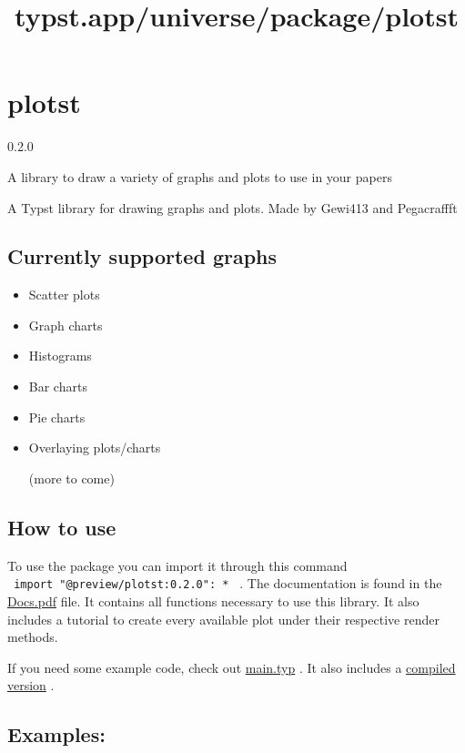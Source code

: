 \title{typst.app/universe/package/plotst}

\label{banner}
\section{plotst}\label{plotst}

{ 0.2.0 }

A library to draw a variety of graphs and plots to use in your papers

\label{readme}
A Typst library for drawing graphs and plots. Made by Gewi413 and
Pegacraffft

\subsection{Currently supported
graphs}\label{currently-supported-graphs}

\begin{itemize}
\item
  Scatter plots
\item
  Graph charts
\item
  Histograms
\item
  Bar charts
\item
  Pie charts
\item
  Overlaying plots/charts

  (more to come)
\end{itemize}

\subsection{How to use}\label{how-to-use}

To use the package you can import it through this command
\texttt{\ import\ "@preview/plotst:0.2.0":\ *\ } . The documentation is
found in the
\href{https://github.com/Pegacraft/typst-plotting/blob/8d834689359b708ce75fe51be05eed45570e463e/docs/Docs.pdf}{Docs.pdf}
file. It contains all functions necessary to use this library. It also
includes a tutorial to create every available plot under their
respective render methods.

If you need some example code, check out
\href{https://github.com/Pegacraft/typst-plotting/blob/8d834689359b708ce75fe51be05eed45570e463e/example/main.typ}{main.typ}
. It also includes a
\href{https://github.com/Pegacraft/typst-plotting/blob/8d834689359b708ce75fe51be05eed45570e463e/example/Plotting.pdf}{compiled
version} .

\subsection{Examples:}\label{examples}

